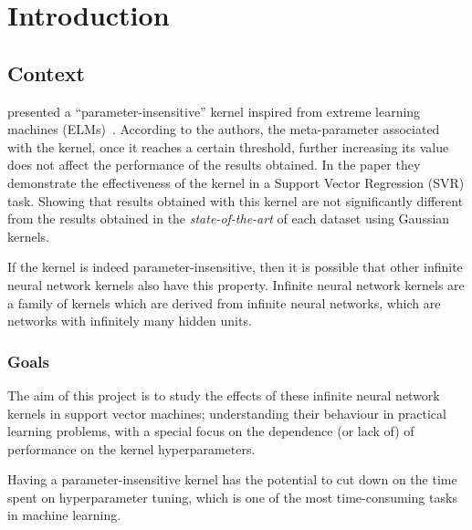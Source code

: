 \chapter{Introduction}
\label{sec:introduction}

\section{Context}


\Textcite{frenayParameterinsensitiveKernelExtreme2011} presented a
``parameter-insensitive'' kernel inspired from extreme learning machines
(ELMs)~\cite{huangExtremeLearningMachine2006}. According to the authors, the
meta-parameter associated with the kernel, once it reaches a certain threshold,
further increasing its value
does not affect the performance of the
results obtained. In the paper they demonstrate the effectiveness of the kernel
in a Support Vector Regression (SVR) task. Showing that results obtained
with this kernel are not significantly different from the results obtained
in the \emph{state-of-the-art} of each dataset using Gaussian kernels.

If the kernel is indeed parameter-insensitive, then it is possible that other
infinite neural network kernels also have this property. Infinite neural network
kernels are a family of kernels which are derived from infinite neural networks,
which are networks with infinitely many hidden units.

\subsection{Goals}

The aim of this project is to study the effects of these infinite neural network
kernels in support vector machines; understanding their behaviour in practical
learning problems, with a special focus on the dependence (or lack of) of
performance on the kernel
hyperparameters.

Having a parameter-insensitive kernel has the potential to cut down on the time
spent on hyperparameter tuning, which is one of the most time-consuming tasks in
machine learning.

